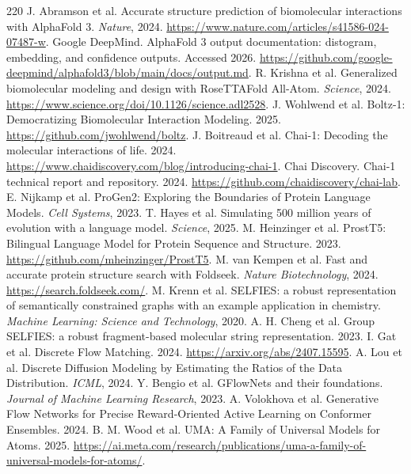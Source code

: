 \documentclass[11pt]{article}
\newcommand{\1}{\mathbf{1}}
\begin{document}
\begin{thebibliography}{220}
 J. Abramson et al. Accurate structure prediction of biomolecular interactions with AlphaFold 3. \emph{Nature}, 2024. \url{https://www.nature.com/articles/s41586-024-07487-w}.
 Google DeepMind. AlphaFold 3 output documentation: distogram, embedding, and confidence outputs. Accessed 2026. \url{https://github.com/google-deepmind/alphafold3/blob/main/docs/output.md}.
 R. Krishna et al. Generalized biomolecular modeling and design with RoseTTAFold All-Atom. \emph{Science}, 2024. \url{https://www.science.org/doi/10.1126/science.adl2528}.
 J. Wohlwend et al. Boltz-1: Democratizing Biomolecular Interaction Modeling. 2025. \url{https://github.com/jwohlwend/boltz}.
 J. Boitreaud et al. Chai-1: Decoding the molecular interactions of life. 2024. \url{https://www.chaidiscovery.com/blog/introducing-chai-1}.
 Chai Discovery. Chai-1 technical report and repository. 2024. \url{https://github.com/chaidiscovery/chai-lab}.
 E. Nijkamp et al. ProGen2: Exploring the Boundaries of Protein Language Models. \emph{Cell Systems}, 2023.
 T. Hayes et al. Simulating 500 million years of evolution with a language model. \emph{Science}, 2025.
 M. Heinzinger et al. ProstT5: Bilingual Language Model for Protein Sequence and Structure. 2023. \url{https://github.com/mheinzinger/ProstT5}.
 M. van Kempen et al. Fast and accurate protein structure search with Foldseek. \emph{Nature Biotechnology}, 2024. \url{https://search.foldseek.com/}.
 M. Krenn et al. SELFIES: a robust representation of semantically constrained graphs with an example application in chemistry. \emph{Machine Learning: Science and Technology}, 2020.
 A. H. Cheng et al. Group SELFIES: a robust fragment-based molecular string representation. 2023.
 I. Gat et al. Discrete Flow Matching. 2024. \url{https://arxiv.org/abs/2407.15595}.
 A. Lou et al. Discrete Diffusion Modeling by Estimating the Ratios of the Data Distribution. \emph{ICML}, 2024.
 Y. Bengio et al. GFlowNets and their foundations. \emph{Journal of Machine Learning Research}, 2023.
 A. Volokhova et al. Generative Flow Networks for Precise Reward-Oriented Active Learning on Conformer Ensembles. 2024.
 B. M. Wood et al. UMA: A Family of Universal Models for Atoms. 2025. \url{https://ai.meta.com/research/publications/uma-a-family-of-universal-models-for-atoms/}.

\end{thebibliography}
\end{document}
